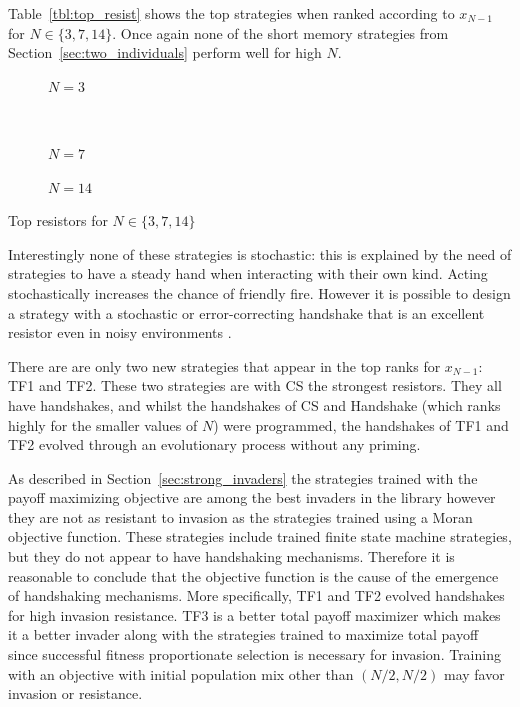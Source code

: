 \documentclass{article}
\begin{document}
Table~\ref{tbl:top_resist} shows the top strategies when ranked
according to \(x_{N-1}\) for \(N\in\{3, 7, 14\}\).
Once again none of the short memory strategies from
Section~\ref{sec:two_individuals} perform well for high \(N\).

\begin{table}[!hbtp]
    \scriptsize
    \centering
    \begin{subfigure}[t]{.5\textwidth}
        \centering
        
        \caption{\(N=3\)}
    \end{subfigure}%
    ~
    \begin{subfigure}[t]{.5\textwidth}
        \centering
        
        \caption{\(N=7\)}
    \end{subfigure}

    \begin{subfigure}[t]{.3\textwidth}
        \centering
        
        \caption{\(N=14\)}
    \end{subfigure}
    \caption{Top resistors for \(N\in\{3, 7, 14\}\)}
    \label{tbl:top_resist}
\end{table}

Interestingly none of these strategies is stochastic: this is explained by
the need of strategies to have a steady hand when interacting with their own
kind. Acting stochastically increases the chance of friendly fire.
However it is possible to design a strategy with a stochastic or error-correcting
handshake that is an excellent resistor even in noisy environments \cite{Lee2015}.

There are are only two new strategies that appear in the top ranks for
\(x_{N-1}\): TF1 and TF2. These two strategies are with CS the strongest
resistors. They all have handshakes, and whilst the handshakes of CS and
Handshake (which ranks highly for the smaller values of \(N\)) were
programmed, the handshakes of TF1 and TF2 evolved through an evolutionary
process without any priming.

As described in Section~\ref{sec:strong_invaders} the strategies trained with
the payoff maximizing objective are among the best invaders in the library
however they are not as resistant to invasion as the strategies trained using a
Moran objective function. These strategies include trained finite state machine
strategies, but they do not appear to have handshaking mechanisms. Therefore it
is reasonable to conclude that the objective function is the cause of the
emergence of handshaking mechanisms. More specifically, TF1 and TF2 evolved
handshakes for high invasion resistance. TF3 is a better total payoff maximizer
which makes it a better invader along with the strategies
trained to maximize total payoff since successful fitness proportionate selection
is necessary for invasion. Training with an objective with initial population
mix other than $(N/2, N/2)$ may favor invasion or resistance.
\end{document}

